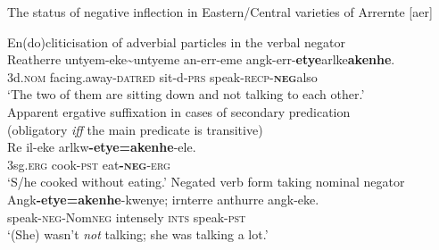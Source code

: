 \documentclass[output=paper,draft,draftmode,colorlinks,citecolor=brown]{langscibook}
\begin{document}
    \newpage
    \begin{exe}\ex\label{ex:austr-arrernte-east-central} 
    The status of negative inflection in Eastern\slash Central varieties of
        Arrernte [aer]
        \begin{xlist}
	\ex En(do)cliticisation of adverbial particles in the verbal negator\\
	\gll Re\textdblhyphen atherre untyem-eke\textasciitilde untyeme an-err-eme angk-err-\textbf{etye}\guillemotleft arlke\guillemotright \textbf{akenhe}.\\
		3d.\textsc{nom} facing.away-\textsc{dat}\textdblhyphen\textsc{red} sit-d-\textsc{prs} speak-\textsc{recp}-\textbf{\textsc{neg}}\guillemotleft also\guillemotright\\
		\glt `The two of them are sitting down and not talking to each
            other.' \\\citep[417]{Henderson2013}
%	
    \ex\label{ex:austr-arrernte-east-central-cook} 
    Apparent ergative suffixation in cases of secondary predication\\(obligatory \textsl{iff} the main predicate is transitive)\\
    \gll Re il-eke arlkw\textbf{-etye=akenhe}-ele.\\
    3sg.\textsc{erg} cook-\textsc{pst} eat\textbf{-\textsc{neg}}-\textsc{erg}\\
    \glt `S/he cooked without eating.'\citep[418]{Henderson2013}
            \ex\label{ex:austr-arrernte-east-central-talkalot} Negated verb form taking nominal negator\\
    \gll Angk\textbf{-etye=akenhe}-kwenye; irnterre anthurre angk-eke.\\
    speak-\textsc{neg}-Nom\textsc{neg} intensely \textsc{ints} speak-\textsc{pst}\\
	\glt `(She) wasn't \textit{not} talking; she was talking a lot.'\citep[416]{Henderson2013}\\
        \end{xlist}\end{exe}
\end{document}
